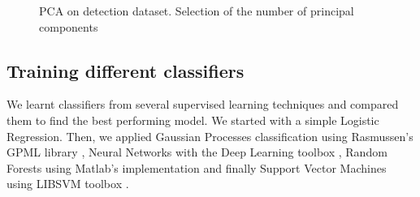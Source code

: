\documentclass[10pt,a4paper]{article}
\begin{document}
   \begin{figure}[ht]
       \center
    	\hfill
	\caption{PCA on detection dataset. Selection of the number of principal components}
  \end{figure}

  \subsection{Training different classifiers}
  We learnt classifiers from several supervised learning techniques and compared them to find the best performing model. We started with a simple Logistic Regression. Then, we applied Gaussian Processes classification using Rasmussen's GPML library \cite{gpmltoolbox},  Neural Networks with the Deep Learning toolbox \cite{deeplearningtoolbox}, Random Forests using Matlab's implementation and finally Support Vector Machines using LIBSVM toolbox \cite{libsvmtoolbox}.
\end{document}
